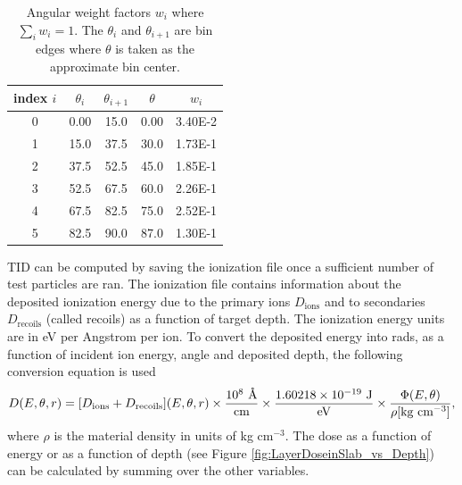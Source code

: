 \documentclass{hitec}
\begin{document}
\begin{table}[h]\centering
	\caption{Angular weight factors $w_i$ where $\sum_i w_i = 1$. The $\theta_i$ and $\theta_{i+1}$ are bin edges where $\theta$ is taken as the approximate bin center.}\label{tab:incidentAngleBins}
	\begin{tabular}{|c | c | c | c | c |}\hline
		index $i$ & $\theta_i$ & $\theta_{i+1}$ & $\theta$ & $w_i$ \\\hline
		0  & 0.00 & 15.0 & 0.00 & 3.40E-2 \\\hline
		1  & 15.0 & 37.5 & 30.0 & 1.73E-1 \\\hline
		2  & 37.5 & 52.5 & 45.0 & 1.85E-1\\\hline
		3  & 52.5 & 67.5 & 60.0 & 2.26E-1 \\\hline
		4  & 67.5 & 82.5 & 75.0 & 2.52E-1\\\hline
    	5  & 82.5 & 90.0 & 87.0 & 1.30E-1\\\hline
	\end{tabular}
\end{table}

TID can be computed by saving the ionization file once a sufficient number of test particles are ran. The ionization file contains information about the deposited ionization energy due to the primary ions $D_{\text{ions}}$ and to secondaries $D_{\text{recoils}}$ (called recoils) as a function of target depth. The ionization energy units are in eV per Angstrom per ion. To convert the deposited energy into rads, as a function of incident ion energy, angle and deposited depth, the following conversion equation is used
\begin{equation}
D(E,\theta,r) = [D_{\text{ions}} + D_{\text{recoils}}](E,\theta,r) \times \frac{10^8 \text{ \si{\angstrom}}}{\text{cm}} \times \frac{1.60218\times 10^{-19} \text{ J}}{\text{eV}} \times \frac{\Phi(E,\theta)}{\rho[\text{kg cm$^{-3}$}]} ,
\end{equation}
where $\rho$ is the material density in units of kg cm$^{-3}$. The dose as a function of energy or as a function of depth (see Figure \ref{fig:LayerDoseinSlab_vs_Depth}) can be calculated by summing over the other variables.
\end{document}

